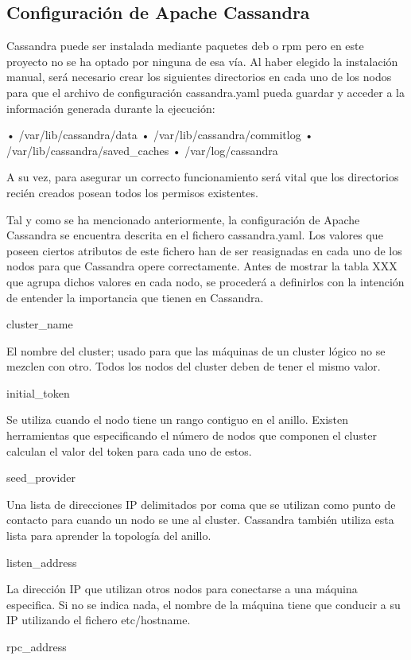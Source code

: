 \subsection{Configuración de Apache Cassandra}

Cassandra puede ser instalada mediante paquetes deb o rpm pero en este proyecto no se ha optado por ninguna de esa vía. Al haber elegido la instalación manual, será necesario crear los siguientes directorios en cada uno de los nodos para que el archivo de configuración cassandra.yaml pueda guardar y acceder a la información generada durante la ejecución:

•	/var/lib/cassandra/data
•	/var/lib/cassandra/commitlog
•	/var/lib/cassandra/saved_caches
•	/var/log/cassandra


A su vez, para asegurar un correcto funcionamiento será vital que los directorios recién creados posean todos los permisos existentes. 

Tal y como se ha mencionado anteriormente, la configuración de Apache Cassandra se encuentra descrita en el fichero cassandra.yaml. Los valores que poseen ciertos atributos de este fichero han de ser reasignadas en cada uno de los nodos para que Cassandra opere correctamente. Antes de mostrar la tabla XXX que agrupa dichos valores en cada nodo, se procederá a definirlos con la intención de entender la importancia que tienen en Cassandra.

cluster_name

El nombre del cluster; usado para que las máquinas de un cluster lógico no se mezclen con otro. Todos los nodos del cluster deben de tener el mismo valor.

initial_token

Se utiliza cuando el nodo tiene un rango contiguo en el anillo. Existen herramientas que especificando el número de nodos que componen el cluster calculan el valor del token para cada uno de estos.

seed_provider

Una lista de direcciones IP delimitados por coma que se utilizan como punto de contacto para cuando un nodo se une al cluster. Cassandra también utiliza esta lista para aprender la topología del anillo.

listen_address

La dirección IP que utilizan otros nodos para conectarse a una máquina especifica. Si no se indica nada, el nombre de la máquina tiene que conducir a su IP utilizando el fichero etc/hostname.

rpc_address

